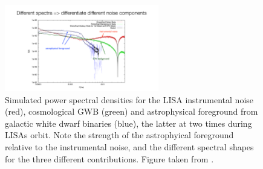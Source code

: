 \begin{figure}[htbp!]

\begin{center}
\includegraphics[width=0.6\textwidth]{Figures/LISA_psds}
\caption{Simulated power spectral densities for the 
LISA instrumental noise (red), cosmological GWB (green)
and astrophysical foreground from galactic white dwarf
binaries (blue), the latter at two times during LISAs orbit.
Note the strength of the astrophyical foreground relative
to the instrumental noise, and the different spectral shapes
for the three different contributions.
Figure taken from \cite{Adams-Cornish:2014}.}
\label{f:LISA_psds}
\end{center}
\end{figure}

